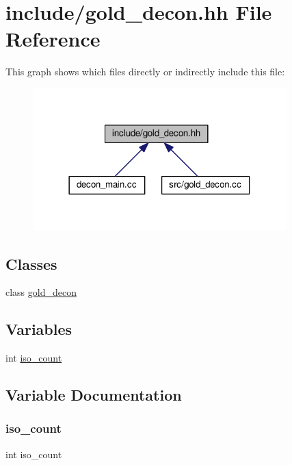 \hypertarget{gold__decon_8hh}{}\section{include/gold\+\_\+decon.hh File Reference}
\label{gold__decon_8hh}
This graph shows which files directly or indirectly include this file\+:
\nopagebreak
\begin{figure}[H]
\begin{center}
\leavevmode
\includegraphics[width=278pt]{gold__decon_8hh__dep__incl}
\end{center}
\end{figure}
\subsection*{Classes}
\begin{DoxyCompactItemize}
\item 
class \mbox{\hyperlink{classgold__decon}{gold\+\_\+decon}}
\end{DoxyCompactItemize}
\subsection*{Variables}
\begin{DoxyCompactItemize}
\item 
int \mbox{\hyperlink{gold__decon_8hh_ab96841bb4729a804d76a68a015d1df14}{iso\+\_\+count}}
\end{DoxyCompactItemize}


\subsection{Variable Documentation}
\mbox{\label{gold__decon_8hh_ab96841bb4729a804d76a68a015d1df14}} 
\subsubsection{\texorpdfstring{iso\+\_\+count}{iso\_count}}
{\footnotesize\ttfamily int iso\+\_\+count}

